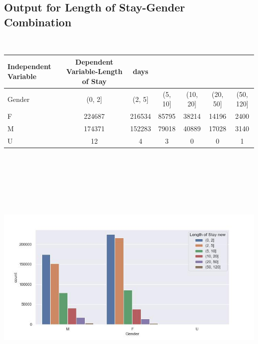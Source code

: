 \documentclass[
	letterpaper, %
]{jdf}
\begin{document}
\subsection{Output for Length of Stay-Gender Combination}
\ 
\begin{jdftable}
\label{table:Example}
\small %
\begin{tabular}{@{} l c c c c c c}
\textbf{Independent Variable} & \textbf{Dependent Variable-Length of Stay} &\textbf{days} & & & \\
	\toprule[0.5pt]
Gender & (0, 2] & (2, 5] & (5, 10] & (10, 20] & (20, 50] & (50, 120] \\ \midrule
F & 224687 & 216534 & 85795 & 38214 & 14196 & 2400 \\ \midrule
M & 174371 & 152283 & 79018 & 40889 & 17028 & 3140 \\ \midrule
U & 12 & 4 & 3 & 0 & 0 & 1 \\
\end{tabular}
\end{jdftable}
\begin{jdffigure}
\includegraphics[height=13cm]{Figures/length-gender.jpg} \\
\label{fig:length-gender}%
\end{jdffigure}
\end{document}
